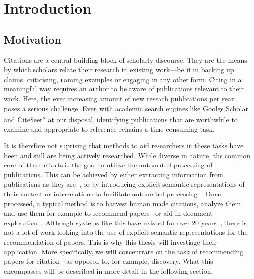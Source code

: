\chapter{Introduction}\label{chap:introduction}
\section{Motivation}
Citations are a central building block of scholarly discourse. They are the means by which scholars relate their research to existing work---be it in backing up claims, criticising, naming examples or engaging in any other form. Citing in a meaningful way requires an author to be aware of publications relevant to their work.
Here, the ever increasing amount of new reseach publications per year poses a serious challenge. Even with academic search engines like Goolge Scholar and CiteSeer\textsuperscript{x} at our disposal, identifying publications that are worthwhile to examine and appropriate to reference remains a time consuming task.

It is therefore not suprising that methods to aid researchers in these tasks have been and still are being actively researched. While diverse in nature, the common core of these efforts is the goal to utilize the automated processing of publications. This can be achieved by either extracting information from publications as they are~\cite{Nasar2018,Beel2016}, or by introducing explicit semantic representations of their content or interrelations to facilitate automated processing~\cite{BuckinghamShum2000,Schneider2013,Jaradeh2019}. %
Once processed, a typical method is to harvest human made citations, analyze them~\cite{Abujbara2013,Teufel2006a} and use them for example to recommend papers~\cite{Beel2016} or aid in document exploration~\cite{Berger2016}. Although systems like this have existed for over 20 years~\cite{Bollacker1998,Beel2016}, there is not a lot of work looking into the use of explicit semantic representations for the recommendation of papers.
This is why this thesis will investiage their application. More specifically, we will concentrate on the task of recommending papers for citation---as opposed to, for example, discovery. What this encompasses will be described in more detail in the following section.


